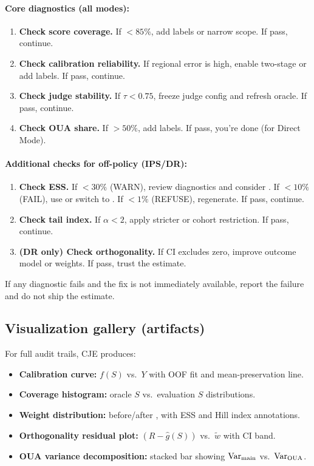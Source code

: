 \paragraph{Core diagnostics (all modes):}
\begin{enumerate}
\item \textbf{Check score coverage.} If $< 85\%$, add labels or narrow scope. If pass, continue.
\item \textbf{Check calibration reliability.} If regional error is high, enable two-stage \autocal{} or add labels. If pass, continue.
\item \textbf{Check judge stability.} If $\tau < 0.75$, freeze judge config and refresh oracle. If pass, continue.
\item \textbf{Check OUA share.} If $> 50\%$, add labels. If pass, you're done (for Direct Mode).
\end{enumerate}

\paragraph{Additional checks for off-policy (IPS/DR):}
\begin{enumerate}[resume]
\item \textbf{Check ESS.} If $< 30\%$ (WARN), review diagnostics and consider \dr. If $< 10\%$ (FAIL), use \simcal{} or switch to \dr. If $< 1\%$ (REFUSE), regenerate. If pass, continue.
\item \textbf{Check tail index.} If $\alpha < 2$, apply stricter \simcal{} or cohort restriction. If pass, continue.
\item \textbf{(DR only) Check orthogonality.} If CI excludes zero, improve outcome model or weights. If pass, trust the estimate.
\end{enumerate}

If any diagnostic fails and the fix is not immediately available, report the failure and do not ship the estimate.

\subsection{Visualization gallery (artifacts)}

For full audit trails, CJE produces:
\begin{itemize}
\item \textbf{Calibration curve:} $f(S)$ vs.\ $Y$ with OOF fit and mean-preservation line.
\item \textbf{Coverage histogram:} oracle $S$ vs.\ evaluation $S$ distributions.
\item \textbf{Weight distribution:} before/after \simcal, with ESS and Hill index annotations.
\item \textbf{Orthogonality residual plot:} $(R - \hat{g}(S))$ vs.\ $\tilde{w}$ with CI band.
\item \textbf{OUA variance decomposition:} stacked bar showing $\operatorname{Var}_{\text{main}}$ vs.\ $\operatorname{Var}_{\text{OUA}}$.
\end{itemize}

